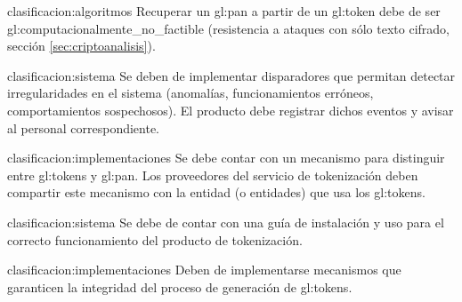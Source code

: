 {clasificacion:algoritmos}
{
  Recuperar un \gls{gl:pan} a partir de un \gls{gl:token} debe de ser
  \gls{gl:computacionalmente_no_factible} (resistencia a ataques con sólo
  texto cifrado, sección \ref{sec:criptoanalisis}).
}

{clasificacion:sistema}
{
  Se deben de implementar disparadores que permitan detectar
  irregularidades en el sistema (anomalías, funcionamientos erróneos,
  comportamientos sospechosos). El producto debe registrar dichos eventos y
  avisar al personal correspondiente.
}

{clasificacion:implementaciones}
{
  Se debe contar con un mecanismo para distinguir entre \glspl{gl:token}
  y \gls{gl:pan}. Los proveedores del servicio de tokenización deben
  compartir este mecanismo con la entidad (o entidades) que usa los
  \glspl{gl:token}.
}

{clasificacion:sistema}
{
  Se debe de contar con una guía de instalación y uso para el correcto
  funcionamiento del producto de tokenización.
}

{clasificacion:implementaciones}
{
  Deben de implementarse mecanismos que garanticen la integridad del proceso
  de generación de \glspl{gl:token}.
}

